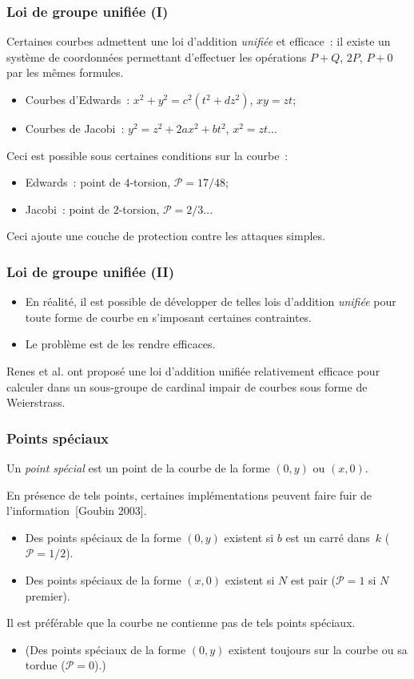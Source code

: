 \documentclass[francais]{beamer}
\newcommand{\prob}{\mathcal{P}}
\newcommand{\bib}[1]{{\usebeamercolor{emph}\textcolor{fg}{~[#1]}}}
\begin{document}
\begin{frame}\frametitle{Loi de groupe unifiée (I)}
Certaines courbes admettent une loi d'addition \emph{unifiée} et efficace :
il existe un système de coordonnées permettant d'effectuer
les opérations $P + Q$, $2 P$, $P + 0$ par les mêmes formules.
\begin{itemize}
\item Courbes d'Edwards : $x^2 + y^2 = c^2 (t^2 + d z^2)$, $xy = zt$;
\item Courbes de Jacobi : $y^2 = z^2 + 2 a x^2 + b t^2$, $x^2 = zt$...
\end{itemize}

Ceci est possible sous certaines conditions sur la courbe :
\begin{itemize}
\item Edwards : point de $4$-torsion, $\prob = 17/48$;
\item Jacobi : point de $2$-torsion, $\prob = 2/3$...
\end{itemize}

Ceci ajoute une couche de protection contre les attaques simples.
\end{frame}

\begin{frame}\frametitle{Loi de groupe unifiée (II)}
\begin{itemize}
\item En réalité, il est possible de développer de telles lois d'addition \emph{unifiée} pour toute forme de courbe en s'imposant certaines contraintes.
\item Le problème est de les rendre efficaces.
\end{itemize}
\begin{block}{}
Renes et al. ont proposé une loi d'addition unifiée relativement efficace
pour calculer dans un sous-groupe de cardinal impair
de courbes sous forme de Weierstrass.
\end{block}
\end{frame}

\begin{frame}\frametitle{Points spéciaux}
Un \emph{point spécial} est un point de la courbe
de la forme $(0, y)$ ou $(x, 0)$.

En présence de tels points, certaines implémentations
peuvent faire fuir de l'information\bib{Goubin 2003}.

\begin{itemize}
\item Des points spéciaux de la forme $(0, y)$ existent
si $b$ est un carré dans~$k$ ($\prob = 1/2$).
\item Des points spéciaux de la forme $(x, 0)$ existent
si $N$ est pair ($\prob = 1$ si $N$ premier).
\end{itemize}

\begin{block}{}
Il est préférable que la courbe ne contienne pas de tels points spéciaux.
\end{block}
\begin{itemize}
\item (Des points spéciaux de la forme $(0, y)$ existent toujours sur la courbe
ou sa tordue ($\prob = 0$).)
\end{itemize}
\end{frame}
\end{document}
